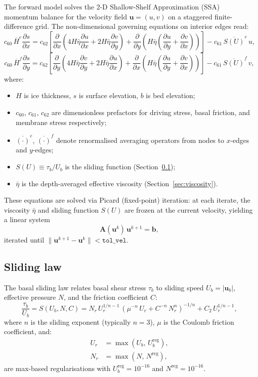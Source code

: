 \documentclass[a4paper,11pt,fleqn]{article}
\newcommand{\ve}[1]{\boldsymbol{#1}}
\newcommand{\be}{\begin{equation}}
\newcommand{\ee}{\end{equation}}
\newcommand{\pd}[2]{\frac{\partial #1}{\partial #2}}
\begin{document}
The forward model solves the 2-D Shallow-Shelf Approximation (SSA) momentum balance for the velocity field $\ve{u} = (u,v)$ on a staggered finite-difference grid. The non-dimensional governing equations on interior edges read:
\be
\label{eq:x_mom}
c_{60}\, \overline{H}^e \pd{s}{x} = c_{62}\left[\pd{}{x}\left(4H\bar\eta\pd{u}{x} + 2H\bar\eta\pd{v}{y}\right) + \pd{}{y}\left(H\bar\eta\left(\pd{u}{y}+\pd{v}{x}\right)\right)\right] - c_{61}\,\overline{S(U)}^e\, u,
\ee
\be
\label{eq:y_mom}
c_{60}\, \overline{H}^f \pd{s}{y} = c_{62}\left[\pd{}{y}\left(4H\bar\eta\pd{v}{y} + 2H\bar\eta\pd{u}{x}\right) + \pd{}{x}\left(H\bar\eta\left(\pd{u}{y}+\pd{v}{x}\right)\right)\right] - c_{61}\,\overline{S(U)}^f\, v,
\ee
where:
\begin{itemize}
    \item $H$ is ice thickness, $s$ is surface elevation, $b$ is bed elevation;
    \item $c_{60}$, $c_{61}$, $c_{62}$ are dimensionless prefactors for driving stress, basal friction, and membrane stress respectively;
    \item $\overline{(\cdot)}^e$, $\overline{(\cdot)}^f$ denote renormalised averaging operators from nodes to $x$-edges and $y$-edges;
    \item $S(U) \equiv \tau_b / U_b$ is the sliding function (Section~\ref{sec:sliding_law});
    \item $\bar\eta$ is the depth-averaged effective viscosity (Section~\ref{sec:viscosity}).
\end{itemize}

These equations are solved via Picard (fixed-point) iteration: at each iterate, the viscosity $\bar\eta$ and sliding function $S(U)$ are frozen at the current velocity, yielding a linear system
\be
\label{eq:linear_system}
\mathbf{A}(\ve{u}^k)\,\ve{u}^{k+1} = \ve{b},
\ee
iterated until $\|\ve{u}^{k+1}-\ve{u}^k\| < \texttt{tol\_vel}$.

\subsection{Sliding law}
\label{sec:sliding_law}

The basal sliding law relates basal shear stress $\tau_b$ to sliding speed $U_b = |\ve{u}_b|$, effective pressure $N$, and the friction coefficient $C$:
\be
\label{eq:sliding_law}
\frac{\tau_b}{U_b} = S(U_b, N, C) = N_r\, U_r^{1/n - 1}\, \left(\mu^{-n}\, U_r + C^{-n}\, N_r^n\right)^{-1/n} + C_2\, U_r^{1/n - 1},
\ee
where $n$ is the sliding exponent (typically $n = 3$), $\mu$ is the Coulomb friction coefficient, and:
\begin{align}
    U_r &= \max(U_b,\, U_b^{\mathrm{reg}}), \label{eq:Ur_reg} \\
    N_r &= \max(N,\, N^{\mathrm{reg}}), \label{eq:Nr_reg}
\end{align}
are max-based regularisations with $U_b^{\mathrm{reg}} = 10^{-16}$ and $N^{\mathrm{reg}} = 10^{-16}$.
\end{document}
